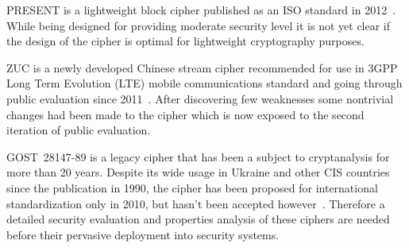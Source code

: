 PRESENT is a lightweight block cipher published
as an ISO standard in 2012~\cite{isoiec-29192}. While being designed for
providing moderate security level it is not yet clear if the design of the cipher is
optimal for lightweight cryptography purposes. 

ZUC is a newly developed
Chinese stream cipher recommended for use in 3GPP Long Term Evolution (LTE)
mobile communications standard and going through public evaluation since
2011~\cite{3gpp:eea3_doc4}. After discovering few weaknesses some nontrivial
changes had been made to the cipher which is now exposed to the second
iteration of public evaluation\cite{3gpp:eea3_doc2}.

GOST~28147-89 is a legacy cipher that has been a subject to cryptanalysis
for more than 20 years. 
Despite its wide usage in Ukraine and
other CIS countries since the publication in 1990, the cipher has been proposed for
international standardization only in 2010, but hasn't been
accepted however~\cite{isoiec-18033}.
Therefore a detailed security evaluation and properties analysis of these
ciphers are needed before their pervasive deployment into security systems.

